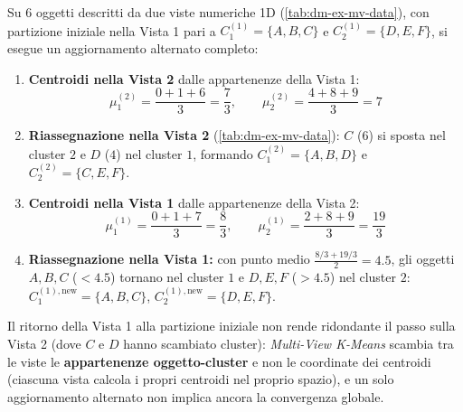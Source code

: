 Su $6$ oggetti descritti da due viste numeriche 1D (\autoref{tab:dm-ex-mv-data}), con partizione iniziale nella Vista 1 pari a $C_1^{(1)} = \{A,B,C\}$ e $C_2^{(1)} = \{D,E,F\}$, si esegue un aggiornamento alternato completo:

\begin{enumerate}
    \item \textbf{Centroidi nella Vista 2} dalle appartenenze della Vista 1:
    \begin{equation*}
        \mu_1^{(2)} = \frac{0 + 1 + 6}{3} = \frac{7}{3}, \qquad \mu_2^{(2)} = \frac{4 + 8 + 9}{3} = 7
    \end{equation*}
    \item \textbf{Riassegnazione nella Vista 2} (\autoref{tab:dm-ex-mv-data}): $C$ ($6$) si sposta nel cluster $2$ e $D$ ($4$) nel cluster $1$, formando $C_1^{(2)} = \{A,B,D\}$ e $C_2^{(2)} = \{C,E,F\}$.
    \item \textbf{Centroidi nella Vista 1} dalle appartenenze della Vista 2:
    \begin{equation*}
        \mu_1^{(1)} = \frac{0 + 1 + 7}{3} = \frac{8}{3}, \qquad \mu_2^{(1)} = \frac{2 + 8 + 9}{3} = \frac{19}{3}
    \end{equation*}
    \item \textbf{Riassegnazione nella Vista 1:} con punto medio $\frac{8/3 + 19/3}{2} = 4.5$, gli oggetti $A,B,C$ ($< 4.5$) tornano nel cluster $1$ e $D,E,F$ ($> 4.5$) nel cluster $2$: $C_1^{(1),\text{new}} = \{A,B,C\}$, $C_2^{(1),\text{new}} = \{D,E,F\}$.
\end{enumerate}

\begin{table}[H]
\centering
\caption{Dati Multi-View e riassegnazione degli oggetti nella Vista 2.}
\label{tab:dm-ex-mv-data}
\small
{}
\end{table}

Il ritorno della Vista 1 alla partizione iniziale non rende ridondante il passo sulla Vista 2 (dove $C$ e $D$ hanno scambiato cluster): \textit{Multi-View K-Means} scambia tra le viste le \textbf{appartenenze oggetto-cluster} e non le coordinate dei centroidi (ciascuna vista calcola i propri centroidi nel proprio spazio), e un solo aggiornamento alternato non implica ancora la convergenza globale.
